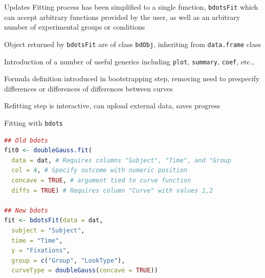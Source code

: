 \documentclass{beamer}
\begin{document}
\begin{frame}{Updates}
Fitting process has been simplified to a single function, \texttt{bdotsFit} which can accept arbitrary functions provided by the user, as well as an arbitrary number of experimental groups or conditions \newline

Object returned by \texttt{bdotsFit} are of class \texttt{bdObj}, inheriting from \texttt{data.frame} class \newline

Introduction of a number of useful generics including \texttt{plot}, \texttt{summary}, \texttt{coef}, etc., \newline 

Formula definition introduced in bootstrapping step, removing need to prespecify differences or differences of differences between curves \newline 

Refitting step is interactive, can upload external data, saves progress \newline 

\end{frame}



\begin{frame}[fragile]{Fitting with \texttt{bdots}}
\lstset{basicstyle=\footnotesize\ttfamily, style = rstyle}
\begin{lstlisting}[language=R, showstringspaces=false,deletekeywords={data,col,time,c,}]
## Old bdots
fit0 <- doubleGauss.fit(
  data = dat, # Requires columns "Subject", "Time", and "Group
  col = 4, # Specify outcome with numeric position
  concave = TRUE, # argument tied to curve function
  diffs = TRUE) # Requires column "Curve" with values 1,2
  
## New bdots
fit <- bdotsFit(data = dat,
  subject = "Subject",
  time = "Time",
  y = "Fixations",
  group = c("Group", "LookType"),
  curveType = doubleGauss(concave = TRUE))
\end{lstlisting}
\end{frame}
\end{document}
